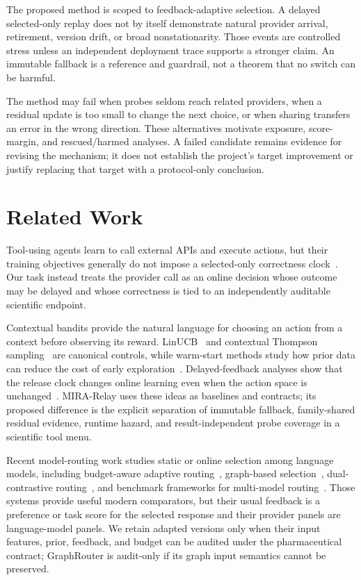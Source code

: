 \documentclass[sigconf,anonymous]{aamas}
\begin{document}
The proposed method is scoped to feedback-adaptive selection. A delayed selected-only replay does not by itself demonstrate natural provider arrival, retirement, version drift, or broad nonstationarity. Those events are controlled stress unless an independent deployment trace supports a stronger claim. An immutable fallback is a reference and guardrail, not a theorem that no switch can be harmful.

The method may fail when probes seldom reach related providers, when a residual update is too small to change the next choice, or when sharing transfers an error in the wrong direction. These alternatives motivate exposure, score-margin, and rescued/harmed analyses. A failed candidate remains evidence for revising the mechanism; it does not establish the project's target improvement or justify replacing that target with a protocol-only conclusion.

\section{Related Work}
Tool-using agents learn to call external APIs and execute actions, but their training objectives generally do not impose a selected-only correctness clock~\cite{schick2023toolformer,yao2023react}. Our task instead treats the provider call as an online decision whose outcome may be delayed and whose correctness is tied to an independently auditable scientific endpoint.

Contextual bandits provide the natural language for choosing an action from a context before observing its reward. LinUCB~\cite{li2010contextual} and contextual Thompson sampling~\cite{agrawal2013thompson} are canonical controls, while warm-start methods study how prior data can reduce the cost of early exploration~\cite{oetomo2023warmstart}. Delayed-feedback analyses show that the release clock changes online learning even when the action space is unchanged~\cite{joulani2013online}. MIRA-Relay uses these ideas as baselines and contracts; its proposed difference is the explicit separation of immutable fallback, family-shared residual evidence, runtime hazard, and result-independent probe coverage in a scientific tool menu.

Recent model-routing work studies static or online selection among language models, including budget-aware adaptive routing~\cite{panda2025pilot}, graph-based selection~\cite{feng2025graphrouter}, dual-contrastive routing~\cite{chen2024routerdc}, and benchmark frameworks for multi-model routing~\cite{hu2024routerbench}. Those systems provide useful modern comparators, but their usual feedback is a preference or task score for the selected response and their provider panels are language-model panels. We retain adapted versions only when their input features, prior, feedback, and budget can be audited under the pharmaceutical contract; GraphRouter is audit-only if its graph input semantics cannot be preserved.
\end{document}
